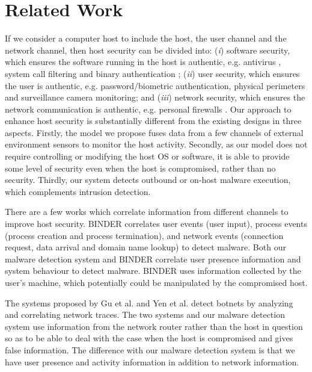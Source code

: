 \section{Related Work}
\label{sec:related}

If we consider a computer host to include the host, the user channel
and the network channel, then host security can be divided into:
({\it i}) software security, which ensures the software running in
the host is authentic, e.g. antivirus \cite{post1998use}, system call
filtering \cite{provos2003improving} and binary authentication \cite{binauth};
({\it ii}) user security, which ensures the user is authentic, e.g.
password/biometric authentication, physical perimeters and
surveillance camera monitoring; and ({\it iii}) network security,
which ensures the network communication is authentic, e.g. personal
firewalls \cite{ingham2002history}. Our approach to enhance host
security is substantially different from the existing designs in
three aspects. Firstly, the model we propose fuses data from a few
channels of external environment sensors to monitor the host
activity. Secondly, as our model does not require controlling or
modifying the host OS or software, it is able to provide some
level of security even when the host is compromised, rather than no security. 
Thirdly, our system
detects outbound or on-host malware execution, which complements
intrusion detection.

There are a few works which correlate information from different
channels to improve host security. BINDER \cite{cui2005design}
correlates user events (user input), process events (process
creation and process termination), and network events (connection
request, data arrival and domain name lookup) to detect malware.
Both our malware detection system and BINDER correlate user presence
information and system behaviour to detect malware. BINDER uses
information collected by the user's machine, which potentially could
be manipulated by the compromised host.

The systems proposed by Gu et al. \cite{gu2007bothunter} and Yen et al.
\cite{yen2008traffic} detect botnets by analyzing and correlating network
traces. The two systems and our malware detection system use
information from the network router rather than the host in question
so as to be able to deal with the case when the host is compromised
and gives false information. The difference with our malware
detection system is that we have user presence and activity
information in addition to network information.

